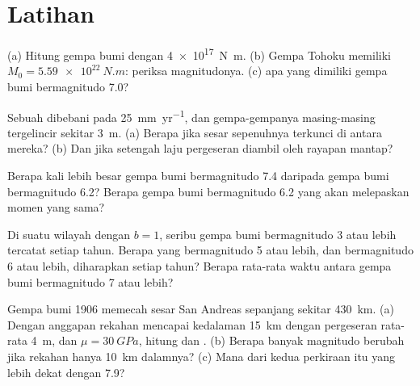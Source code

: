 \section{Latihan}

\begin{exercise}[$\star$]\label{exo:b1:earthquake-source:1}
(a) Hitung  gempa bumi dengan  \qty{4e17}{N.m}. (b) Gempa Tohoku memiliki $M_0 = \qty{5.59e22}{N.m}$: periksa magnitudonya. (c)  apa yang dimiliki gempa bumi bermagnitudo 7.0?
\end{exercise}

\begin{exercise}[$\star$]\label{exo:b1:earthquake-source:2}
Sebuah  dibebani pada \qty{25}{mm.yr^{-1}}, dan gempa-gempanya masing-masing tergelincir sekitar \qty{3}{m}. (a) Berapa  jika sesar sepenuhnya terkunci di antara mereka? (b) Dan jika setengah laju pergeseran diambil oleh rayapan mantap?
\end{exercise}

\begin{exercise}[$\star$]\label{exo:b1:earthquake-source:3}
Berapa kali lebih besar  gempa bumi bermagnitudo 7.4 daripada gempa bumi bermagnitudo 6.2? Berapa gempa bumi bermagnitudo 6.2 yang akan melepaskan momen yang sama?
\end{exercise}

\begin{exercise}[$\star$]\label{exo:b1:earthquake-source:4}
Di suatu wilayah dengan $b = 1$, seribu gempa bumi bermagnitudo 3 atau lebih tercatat setiap tahun. Berapa yang bermagnitudo 5 atau lebih, dan bermagnitudo 6 atau lebih, diharapkan setiap tahun? Berapa rata-rata waktu antara gempa bumi bermagnitudo 7 atau lebih?
\end{exercise}

\begin{exercise}[$\star\star$]\label{exo:b1:earthquake-source:5}
Gempa bumi 1906 memecah sesar San Andreas sepanjang sekitar \qty{430}{km}. (a) Dengan anggapan rekahan mencapai kedalaman \qty{15}{km} dengan pergeseran rata-rata \qty{4}{m}, dan $\mu = \qty{30}{GPa}$, hitung  dan . (b) Berapa banyak magnitudo berubah jika rekahan hanya \qty{10}{km} dalamnya? (c) Mana dari kedua perkiraan itu yang lebih dekat dengan 7.9?
\end{exercise}

